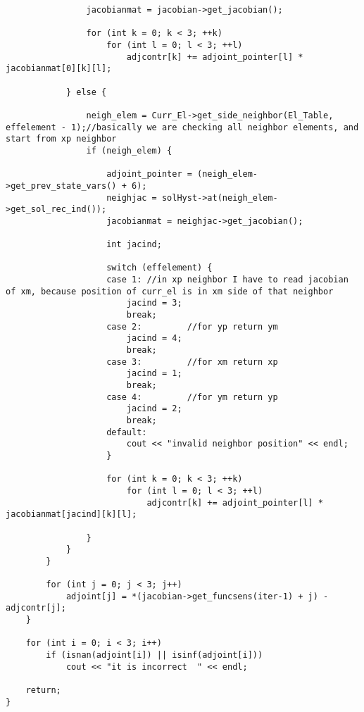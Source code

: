 \documentclass[a4paper,10pt]{article}
\begin{document}
\begin{lstlisting}
				jacobianmat = jacobian->get_jacobian();

				for (int k = 0; k < 3; ++k)
					for (int l = 0; l < 3; ++l)
						adjcontr[k] += adjoint_pointer[l] * jacobianmat[0][k][l];

			} else {

				neigh_elem = Curr_El->get_side_neighbor(El_Table, effelement - 1);//basically we are checking all neighbor elements, and start from xp neighbor
				if (neigh_elem) {

					adjoint_pointer = (neigh_elem->get_prev_state_vars() + 6);
					neighjac = solHyst->at(neigh_elem->get_sol_rec_ind());
					jacobianmat = neighjac->get_jacobian();

					int jacind;

					switch (effelement) {
					case 1:	//in xp neighbor I have to read jacobian of xm, because position of curr_el is in xm side of that neighbor
						jacind = 3;
						break;
					case 2:		    //for yp return ym
						jacind = 4;
						break;
					case 3:		    //for xm return xp
						jacind = 1;
						break;
					case 4:		    //for ym return yp
						jacind = 2;
						break;
					default:
						cout << "invalid neighbor position" << endl;
					}

					for (int k = 0; k < 3; ++k)
						for (int l = 0; l < 3; ++l)
							adjcontr[k] += adjoint_pointer[l] * jacobianmat[jacind][k][l];

				}
			}
		}

		for (int j = 0; j < 3; j++)
			adjoint[j] = *(jacobian->get_funcsens(iter-1) + j) - adjcontr[j];
	}

	for (int i = 0; i < 3; i++)
		if (isnan(adjoint[i]) || isinf(adjoint[i]))
			cout << "it is incorrect  " << endl;

	return;
}
\end{lstlisting}
\end{document}
